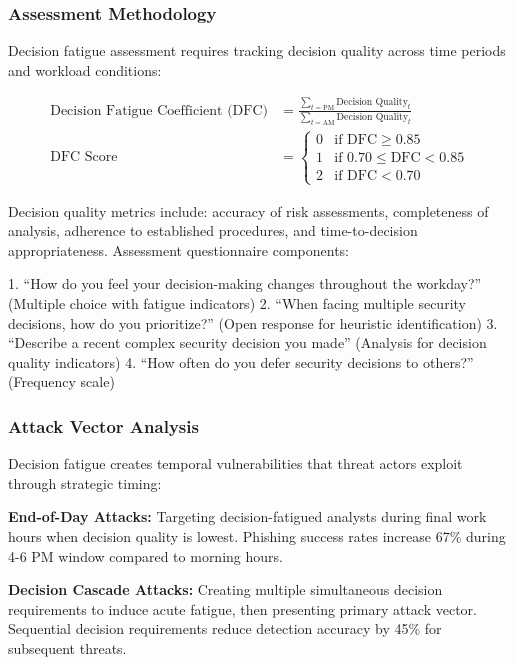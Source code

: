 \documentclass[11pt,a4paper]{article}
\begin{document}
\subsubsection{Assessment Methodology}

Decision fatigue assessment requires tracking decision quality across time periods and workload conditions:

\begin{align}
\text{Decision Fatigue Coefficient (DFC)} &= \frac{\sum_{t=\text{PM}} \text{Decision Quality}_t}{\sum_{t=\text{AM}} \text{Decision Quality}_t} \\
\text{DFC Score} &= \begin{cases}
0 & \text{if DFC} \geq 0.85 \\
1 & \text{if } 0.70 \leq \text{DFC} < 0.85 \\
2 & \text{if DFC} < 0.70
\end{cases}
\end{align}

Decision quality metrics include: accuracy of risk assessments, completeness of analysis, adherence to established procedures, and time-to-decision appropriateness. Assessment questionnaire components:

1. ``How do you feel your decision-making changes throughout the workday?'' (Multiple choice with fatigue indicators)
2. ``When facing multiple security decisions, how do you prioritize?'' (Open response for heuristic identification)
3. ``Describe a recent complex security decision you made'' (Analysis for decision quality indicators)
4. ``How often do you defer security decisions to others?'' (Frequency scale)

\subsubsection{Attack Vector Analysis}

Decision fatigue creates temporal vulnerabilities that threat actors exploit through strategic timing:

\textbf{End-of-Day Attacks:} Targeting decision-fatigued analysts during final work hours when decision quality is lowest. Phishing success rates increase 67\% during 4-6 PM window compared to morning hours.

\textbf{Decision Cascade Attacks:} Creating multiple simultaneous decision requirements to induce acute fatigue, then presenting primary attack vector. Sequential decision requirements reduce detection accuracy by 45\% for subsequent threats.
\end{document}
